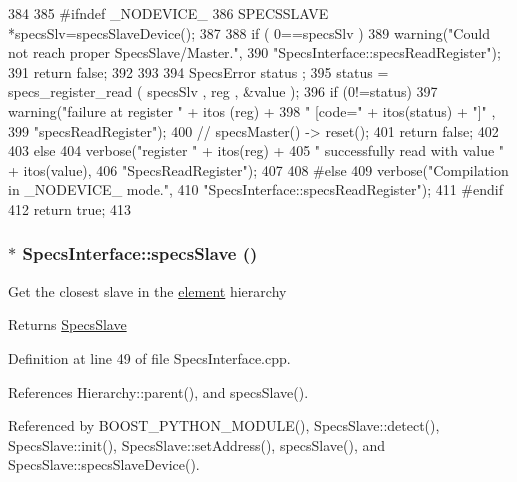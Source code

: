 \begin{DoxyCode}
384                                                  {
385 #ifndef _NODEVICE_
386   SPECSSLAVE *specsSlv=specsSlaveDevice();
387 
388   if ( 0==specsSlv  ){
389     warning("Could not reach proper SpecsSlave/Master.",
390             "SpecsInterface::specsReadRegister");
391     return false;
392   }
393   
394   SpecsError status ;
395   status = specs_register_read ( specsSlv , reg , &value );
396   if (0!=status){
397     warning("failure at register " + itos (reg) +
398             " [code=" + itos(status) + "]" ,
399             "specsReadRegister");
400     //    specsMaster() -> reset();
401     return false;
402   }
403   else {
404     verbose("register " + itos(reg) +
405             " successfully read with value " + itos(value),
406             "SpecsReadRegister");
407   }
408 #else
409   verbose("Compilation in _NODEVICE_ mode.",
410           "SpecsInterface::specsReadRegister");
411 #endif
412   return true;
413 }
\end{DoxyCode}
\hypertarget{classSpecsInterface_a13cf39bddfa8ba21d6e6aa78e78f0e4f}{
\subsubsection[{specsSlave}]{ $\ast$ SpecsInterface::specsSlave ()}}
\label{classSpecsInterface_a13cf39bddfa8ba21d6e6aa78e78f0e4f}
Get the closest slave in the \hyperlink{namespaceelement}{element} hierarchy \begin{DoxyReturn}{Returns}
\hyperlink{classSpecsSlave}{SpecsSlave} 
\end{DoxyReturn}


Definition at line 49 of file SpecsInterface.cpp.

References Hierarchy::parent(), and specsSlave().

Referenced by BOOST\_\-PYTHON\_\-MODULE(), SpecsSlave::detect(), SpecsSlave::init(), SpecsSlave::setAddress(), specsSlave(), and SpecsSlave::specsSlaveDevice().


